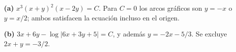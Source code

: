\noindent\textbf{(a)} $x^3(x+y)^2(x-2y)=C$. Para $C=0$ los arcos gráficos son $y=-x$ o $y=x/2$; ambos satisfacen la ecuación incluso en el origen.

\noindent\textbf{(b)} $3x+6y-\log|6x+3y+5|=C$, y además $y=-2x-5/3$. Se excluye $2x+y=-3/2$.
